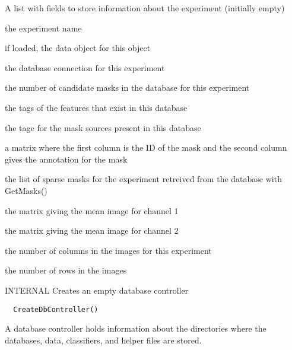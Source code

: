 \documentclass[a4paper]{book}
\begin{document}
\begin{Value}
A list with fields to store information about the
experiment (initially empty) \begin{ldescription}
\item[\code{name}] the experiment
name\item[\code{data}] if loaded, the data object for this
object\item[\code{db}] the database connection for this
experiment\item[\code{nmasks}] the number of candidate masks
in the database for this experiment\item[\code{features}] the
tags of the features that exist in this database
\item[\code{sources}] the tage for the mask sources present in
this database\item[\code{selmat}] a matrix where the first
column is the ID of the mask and the second column gives
the annotation for the mask\item[\code{sms}] the list of
sparse masks for the experiment retreived from the
database with GetMasks()\item[\code{mimg1}] the matrix giving
the mean image for channel 1\item[\code{mimg2}] the matrix
giving the mean image for channel 2\item[\code{nx}] the number
of columns in the images for this experiment
\item[\code{ny}] the number of rows in the images
\end{ldescription}
\end{Value}
%
\begin{Description}\relax
INTERNAL Creates an empty database controller
\end{Description}
%
\begin{Usage}
\begin{verbatim}
  CreateDbController()
\end{verbatim}
\end{Usage}
%
\begin{Details}\relax
A database controller holds information about the
directories where the databases, data, classifiers, and
helper files are stored. \\{}
\end{Details}
%
\end{document}
